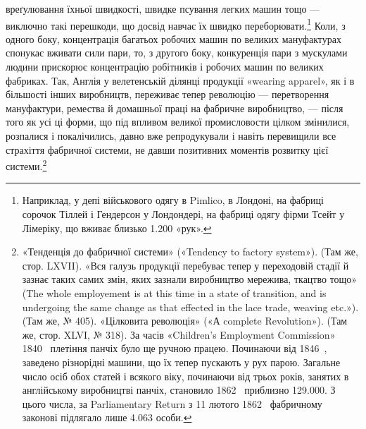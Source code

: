 \parcont{}  %
вреґулювання їхньої швидкості, швидке псування легких машин
тощо — виключно такі перешкоди, що досвід навчає їх швидко
переборювати.\footnote{
Наприклад, у депі військового одягу в Pimlico, в Лондоні, на
фабриці сорочок Тіллей і Гендерсон у Лондондері, на фабриці одягу фірми
Тсейт у Лімеріку, що вживає близько \num{1.200} «рук».
} Коли, з одного боку, концентрація багатьох
робочих машин по великих мануфактурах спонукає вживати сили
пари, то, з другого боку, конкуренція пари з мускулами людини
прискорює концентрацію робітників і робочих машин по великих
фабриках. Так, Англія у велетенській ділянці продукції «wearing
apparel», як і в більшості інших виробництв, переживає тепер
революцію — перетворення мануфактури, ремества й домашньої
праці на фабричне виробництво, — після того як усі ці форми,
що під впливом великої промисловости цілком змінилися,
розпалися і покалічились, давно вже репродукували і навіть
перевищили все страхіття фабричної системи, не давши позитивних
моментів розвитку цієї системи.\footnote{
«Тенденція до фабричної системи» («Tendency to factory system»).
(Там же, стор. LXVII). «Вся галузь продукції перебуває тепер у переходовій
стадії й зазнає таких самих змін, яких зазнали виробництво мережива,
ткацтво тощо» (The whole employement is at this time in a state
of transition, and is undergoing the same change as that effected in the
lace trade, weaving etc.»). (Там же, № 405). «Цілковита революція» («А
complete Revolution»). (Там же, стор. XLVI, № 318). За часів «Children’s
Employment Commission» 1840~ плетіння панчіх було ще ручною
працею. Починаючи від 1846~, заведено різнорідні машини, що їх тепер
пускають у рух парою. Загальне число осіб обох статей і всякого
віку, починаючи від трьох років, занятих в англійському виробництві
панчіх, становило 1862~ приблизно \num{129.000}. З цього числа, за Parliamentary
Return з 11 лютого 1862~ фабричному законові підлягало
лише \num{4.063} особи.
}

